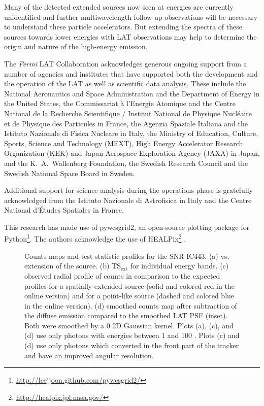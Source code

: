 \documentclass[12pt,preprint]{aastex}
\newif\ifcolorfigure
\newcommand{\gev}{\text{GeV}\xspace}
\newcommand{\tev}{\text{TeV}\xspace}
\newcommand{\tsext}{{\ensuremath{\text{TS}_{\text{ext}}}}\xspace}
\newcommand{\ts}{\text{TS}\xspace}
\begin{document}
Many of the \tev detected extended sources now seen at \gev energies
are currently unidentified and further multiwavelength follow-up
observations will be necessary to understand these particle accelerators.
But extending the spectra of these \tev sources towards lower energies
with LAT observations may help to determine the origin and nature of
the high-energy emission.



The \textit{Fermi} LAT Collaboration acknowledges generous ongoing support
from a number of agencies and institutes that have supported both the
development and the operation of the LAT as well as scientific data analysis.
These include the National Aeronautics and Space Administration and the
Department of Energy in the United States, the Commissariat \`a l'Energie Atomique
and the Centre National de la Recherche Scientifique / Institut National de Physique
Nucl\'eaire et de Physique des Particules in France, the Agenzia Spaziale Italiana
and the Istituto Nazionale di Fisica Nucleare in Italy, the Ministry of Education,
Culture, Sports, Science and Technology (MEXT), High Energy Accelerator Research
Organization (KEK) and Japan Aerospace Exploration Agency (JAXA) in Japan, and
the K.~A.~Wallenberg Foundation, the Swedish Research Council and the
Swedish National Space Board in Sweden.

Additional support for science analysis during the operations phase is gratefully
acknowledged from the Istituto Nazionale di Astrofisica in Italy and the Centre National d'\'Etudes Spatiales in France.

This research has made use of
pywcsgrid2, an open-source plotting package for
Python\footnote{\url{http://leejjoon.github.com/pywcsgrid2/}}. The authors acknowledge the
use of HEALPix\footnote{\url{http://healpix.jpl.nasa.gov/}} \citep{healpix}.





\clearpage
\begin{figure}
    \ifcolorfigure
    \plotone{ic443_plots/four_plots_ic443_color.eps}
    \else
    \fi
    \caption{
    Counts maps and test statistic profiles for the SNR IC443. (a) \ts
    vs. extension of the source. (b) \tsext for individual energy
    bands. (c) observed radial profile of counts in comparison to the
    expected profiles for a spatially extended source (solid and colored
    red in the online version) and for a point-like source (dashed and colored
    blue in the online version).  (d) smoothed counts map after subtraction
    of the diffuse emission compared to the smoothed
    LAT PSF (inset). Both were smoothed by a 0 2D Gaussian kernel.
    Plots (a),
    (c), and (d) use only 
    photons with energies between
    1 \gev and 100 \gev.  Plots (c) and (d) use
    only photons which converted in the front part of the tracker and
    have an improved angular resolution.
    }
    \label{four_plots_ic443}
\end{figure}
\end{document}
